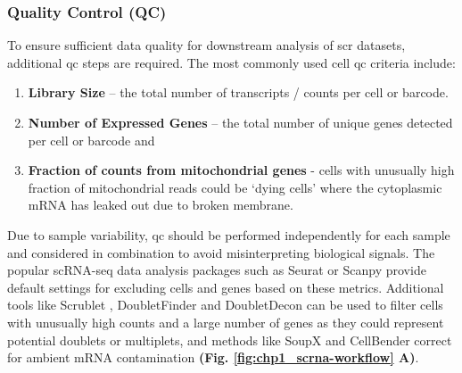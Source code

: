 \subsubsection{Quality Control (QC)}

\par To ensure sufficient data quality for downstream analysis of \gls{scr} datasets, additional \gls{qc} steps are required. The most commonly used cell \gls{qc} criteria include:
\begin{enumerate}
    \item \textbf{Library Size} – the total number of transcripts / counts per cell or barcode.
    \item \textbf{Number of Expressed Genes} – the total number of unique genes detected per cell or barcode and
    \item \textbf{Fraction of counts from mitochondrial genes } - cells with unusually high fraction of mitochondrial reads could be `dying cells’ where the cytoplasmic mRNA has leaked out due to broken membrane.
\end{enumerate}
\par Due to sample variability, \gls{qc} should be performed independently for each sample and considered in combination to avoid misinterpreting biological signals. The popular scRNA-seq data analysis packages such as Seurat \textbf{\cite{butler_integrating_2018,stuart_comprehensive_2019,hao_integrated_2021}} or Scanpy \textbf{\cite{wolf_scanpy_2018}} provide default settings for excluding cells and genes based on these metrics. Additional tools like Scrublet \textbf{\cite{wolock_scrublet_2019}}, DoubletFinder \textbf{\cite{mcginnis_doubletfinder_2019}} and DoubletDecon \textbf{\cite{depasquale_doubletdecon:_2019}} can be used to filter cells with unusually high counts and a large number of genes as they could represent potential doublets or multiplets, and methods like SoupX \textbf{\cite{young_soupx_2020}} and CellBender \textbf{\cite{fleming_unsupervised_2023}} correct for ambient mRNA contamination \textbf{(Fig. \ref{fig:chp1_scrna-workflow} A)}.

